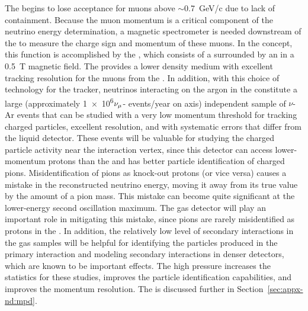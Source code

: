 The  begins to lose acceptance for muons above $\sim$\SI{0.7}{GeV/c} due to lack of containment. Because the muon momentum is a critical component of the neutrino energy determination, a magnetic spectrometer is needed downstream of the  to measure the charge sign and momentum of these muons. In the   concept, this function is accomplished by the , which consists of a  surrounded by an  in a \SI{0.5}{T} magnetic field. The  provides a lower density medium with excellent tracking resolution for the muons from the . In addition, with this choice of technology for the tracker, neutrinos interacting on the argon in the  constitute a large (approximately \num{1e6}$\nu_\mu$- events/year on axis) independent sample of $\nu$-Ar events that can be studied with a very low momentum threshold for tracking charged particles,  excellent resolution, and with systematic errors that differ from the liquid detector. These events will be valuable for studying the charged particle activity near the interaction vertex, since this detector can access lower-momentum protons than the  and has better particle identification of charged pions.  Misidentification of pions as knock-out protons (or vice versa) causes a mistake in the reconstructed neutrino energy, moving it away from its true value by the amount of a pion mass.  This mistake can become quite significant at the lower-energy second oscillation maximum. The gas detector will play an important role in mitigating this mistake, since pions are rarely misidentified as protons in the .  In addition, the relatively low level of secondary interactions in the gas samples will be helpful for identifying the particles produced in the primary interaction and modeling secondary interactions in denser detectors, which are known to be important effects\cite{Friedland:2018vry}. The high pressure increases the statistics for these studies, improves the particle identification capabilities, and improves the momentum resolution. 
The  is discussed further in Section~\ref{sec:appx-nd:mpd}.



